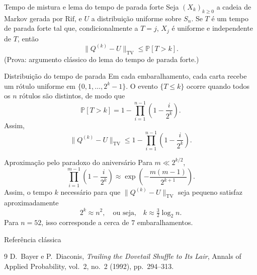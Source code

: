 \documentclass[10pt]{beamer}
\newcommand{\Prb}{\mathbb{P}}
\newcommand{\Rif}{\mathrm{Rif}}
\newcommand{\TV}{\mathrm{TV}}
\begin{document}
\begin{frame}{Tempo de mistura e lema do tempo de parada forte}
  Seja \((X_k)_{k\ge0}\) a cadeia de Markov gerada por \(\Rif\),
  e \(U\) a distribuição uniforme sobre \(S_n\).
  Se \(T\) é um tempo de parada forte tal que,
  condicionalmente a \(T=j\),
  \(X_j\) é uniforme e independente de \(T\),
  então
  \[
    \|Q^{(k)}-U\|_{\TV} \le \Prb[T>k].
  \]
  (Prova: argumento clássico do lema do tempo de parada forte.)
\end{frame}

\begin{frame}{Distribuição do tempo de parada}
  Em cada embaralhamento, cada carta recebe um rótulo uniforme
  em \(\{0,1,\dots,2^k-1\}\).
  O evento \(\{T\le k\}\) ocorre quando todos os \(n\) rótulos são distintos,
  de modo que
  \[
    \Prb[T>k]
      = 1 - \prod_{i=1}^{n-1}\left(1-\frac{i}{2^k}\right).
  \]
  Assim,
  \[
    \|Q^{(k)} - U\|_{\TV} 
       \le 1 - \prod_{i=1}^{n-1}\left(1-\frac{i}{2^k}\right).
  \]
\end{frame}

\begin{frame}{Aproximação pelo paradoxo do aniversário}
  Para \(m\ll 2^{k/2}\),
  \[
    \prod_{i=1}^{m-1}\left(1-\frac{i}{2^k}\right)
      \approx \exp\!\left(-\frac{m(m-1)}{2^{k+1}}\right).
  \]
  Assim, o tempo \(k\) necessário para que 
  \(\|Q^{(k)} - U\|_{\TV}\) seja pequeno
  satisfaz aproximadamente
  \[
    2^k \approx n^2,
    \quad\text{ou seja,}\quad
    k \approx \tfrac{3}{2}\log_2 n.
  \]
  Para \(n=52\), isso corresponde a cerca de \(7\) embaralhamentos.
\end{frame}

\begin{frame}{Referência clássica}
  \begin{thebibliography}{9}
      D.~Bayer e P.~Diaconis,
      \emph{Trailing the Dovetail Shuffle to Its Lair},
      Annals of Applied Probability, vol.~2, no.~2 (1992), pp.~294–313.
  \end{thebibliography}
\end{frame}
\end{document}
